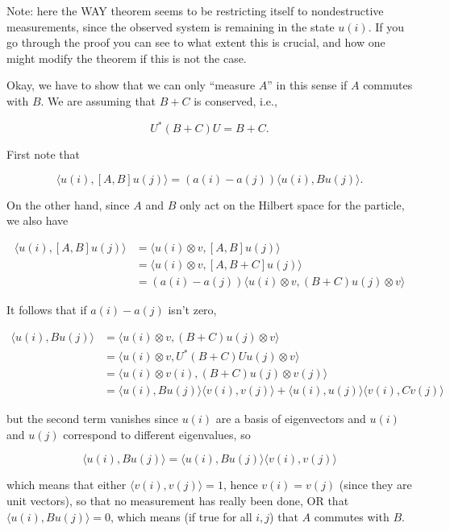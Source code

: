 \documentclass{article}
\begin{document}
Note: here the WAY theorem seems to be restricting itself to
nondestructive measurements, since the observed system is remaining in
the state \(u(i)\). If you go through the proof you can see to what
extent this is crucial, and how one might modify the theorem if this is
not the case.

Okay, we have to show that we can only ``measure \(A\)'' in this sense
if \(A\) commutes with \(B\). We are assuming that \(B + C\) is
conserved, i.e.,

\[U^*(B + C)U = B + C.\]

First note that

\[\langle u(i), [A,B] u(j)\rangle = (a(i) - a(j)) \langle u(i), Bu(j)\rangle.\]

On the other hand, since \(A\) and \(B\) only act on the Hilbert space
for the particle, we also have

\[\begin{aligned}\langle u(i),[A,B]u(j) \rangle &= \langle u(i)\otimes v,[A,B]u(j) \rangle \\ &= \langle u(i)\otimes v,[A,B+C]u(j) \rangle \\ &= (a(i)-a(j))\langle u(i)\otimes v,(B+C)u(j)\otimes v \rangle\end{aligned}\]

It follows that if \(a(i) - a(j)\) isn't zero,

\[\begin{aligned}\langle u(i),Bu(j) \rangle &= \langle u(i)\otimes v,(B+C)u(j)\otimes v \rangle \\ &= \langle u(i)\otimes v, U^*(B+C)Uu(j)\otimes v \rangle \\ &= \langle u(i)\otimes v(i),(B+C)u(j)\otimes v(j) \rangle \\ &= \langle u(i),Bu(j) \rangle\langle v(i),v(j) \rangle + \langle u(i),u(j) \rangle\langle v(i),Cv(j) \rangle\end{aligned}\]

but the second term vanishes since \(u(i)\) are a basis of eigenvectors
and \(u(i)\) and \(u(j)\) correspond to different eigenvalues, so

\[\langle u(i), Bu(j)\rangle = \langle u(i), Bu(j)\rangle \langle v(i), v(j)\rangle\]

which means that either \(\langle v(i), v(j)\rangle = 1\), hence
\(v(i) = v(j)\) (since they are unit vectors), so that no measurement
has really been done, OR that \(\langle u(i), B u(j)\rangle = 0\), which
means (if true for all \(i,j\)) that \(A\) commutes with \(B\).
\end{document}
